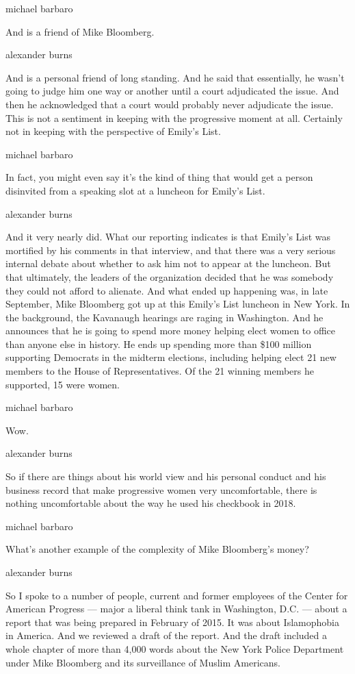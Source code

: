 michael barbaro

And is a friend of Mike Bloomberg.

alexander burns

And is a personal friend of long standing. And he said that essentially,
he wasn't going to judge him one way or another until a court
adjudicated the issue. And then he acknowledged that a court would
probably never adjudicate the issue. This is not a sentiment in keeping
with the progressive moment at all. Certainly not in keeping with the
perspective of Emily's List.

michael barbaro

In fact, you might even say it's the kind of thing that would get a
person disinvited from a speaking slot at a luncheon for Emily's List.

alexander burns

And it very nearly did. What our reporting indicates is that Emily's
List was mortified by his comments in that interview, and that there was
a very serious internal debate about whether to ask him not to appear at
the luncheon. But that ultimately, the leaders of the organization
decided that he was somebody they could not afford to alienate. And what
ended up happening was, in late September, Mike Bloomberg got up at this
Emily's List luncheon in New York. In the background, the Kavanaugh
hearings are raging in Washington. And he announces that he is going to
spend more money helping elect women to office than anyone else in
history. He ends up spending more than \$100 million supporting
Democrats in the midterm elections, including helping elect 21 new
members to the House of Representatives. Of the 21 winning members he
supported, 15 were women.

michael barbaro

Wow.

alexander burns

So if there are things about his world view and his personal conduct and
his business record that make progressive women very uncomfortable,
there is nothing uncomfortable about the way he used his checkbook in
2018.

michael barbaro

What's another example of the complexity of Mike Bloomberg's money?

alexander burns

So I spoke to a number of people, current and former employees of the
Center for American Progress --- major a liberal think tank in
Washington, D.C. --- about a report that was being prepared in February
of 2015. It was about Islamophobia in America. And we reviewed a draft
of the report. And the draft included a whole chapter of more than 4,000
words about the New York Police Department under Mike Bloomberg and its
surveillance of Muslim Americans.

